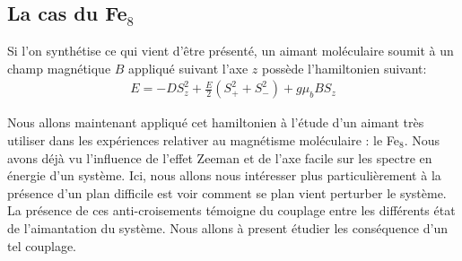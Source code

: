 \subsection{La cas du Fe$_8$}
Si l'on synthétise ce qui vient d'\^etre présenté, un aimant moléculaire soumit à un champ magnétique $B$ appliqué suivant l'axe $z$ possède l'hamiltonien suivant:
\begin{eqnarray}
E =  -DS_z^2 + \frac{E}{2} ( S_+^2  + S_-^2) + g\mu_b B S_z 
\end{eqnarray}


Nous allons maintenant appliqué cet hamiltonien à l'étude d'un aimant très utiliser dans les expériences relativer au magnétisme moléculaire : le Fe$_8$. Nous avons déjà vu l'influence de l'effet Zeeman et de l'axe facile sur les spectre en énergie d'un système. Ici, nous allons nous intéresser plus particulièrement à la présence d'un plan difficile est voir comment se plan vient perturber le système. La présence de ces anti-croisements témoigne du couplage entre les différents état de l'aimantation du système. Nous allons à present étudier les conséquence d'un tel couplage.

